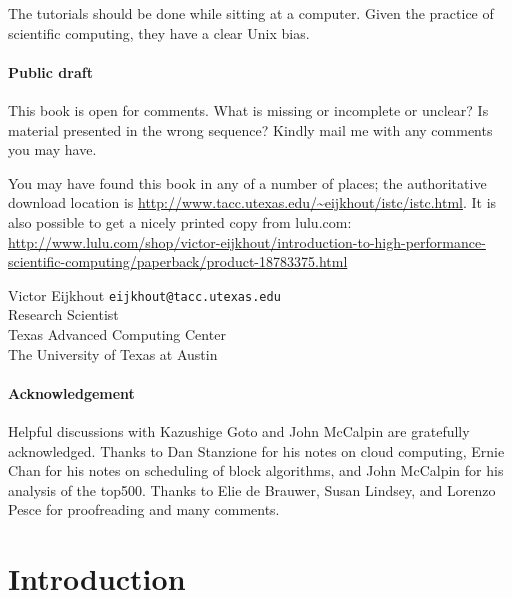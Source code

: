The tutorials
should be done while sitting at a computer. Given the practice of
scientific computing, they have a clear Unix bias.

\begin{notlulu}
\paragraph*{\bf Public draft}

This book is 
open for comments.
What is missing or incomplete or unclear? Is material
presented in the wrong sequence? Kindly mail me with any comments you
may have.
\end{notlulu}

\begin{download}
You may have found this book in any of a number of places; the
authoritative download location is \url{http://www.tacc.utexas.edu/~eijkhout/istc/istc.html}.
It is also possible to get a nicely printed copy from lulu.com:
\url{http://www.lulu.com/shop/victor-eijkhout/introduction-to-high-performance-scientific-computing/paperback/product-18783375.html}
\end{download}

\bigskip
\noindent
Victor Eijkhout {\tt eijkhout@tacc.utexas.edu}\\
Research Scientist\\
Texas Advanced Computing Center\\
The University of Texas at Austin

\paragraph*{\bf Acknowledgement}

Helpful discussions with Kazushige Goto and John McCalpin are gratefully
acknowledged. Thanks to Dan Stanzione for his notes on cloud computing,
Ernie Chan for his notes on scheduling of block algorithms, and John
McCalpin for his analysis of the top500.
Thanks to Elie de Brauwer, Susan Lindsey, and Lorenzo Pesce
for proofreading and many comments.

\pagebreak
\thispagestyle{empty}
\section*{Introduction}


